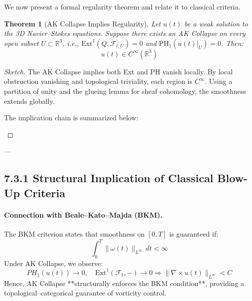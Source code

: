 \documentclass[11pt]{article}
\newtheorem{theorem}{Theorem}[section]
\theoremstyle{definition}
\begin{document}
We now present a formal regularity theorem and relate it to classical criteria.

\begin{theorem}[AK Collapse Implies Regularity]
Let \( u(t) \) be a weak solution to the 3D Navier–Stokes equations.  
Suppose there exists an AK Collapse on every open subset \( U \subset \mathbb{R}^3 \),  
i.e., $\mathrm{Ext}^1(Q, \mathcal{F}_{t,U}) = 0$ and $\mathrm{PH}_1(u(t)|_U) = 0$. Then:
\[
u(t) \in C^\infty(\mathbb{R}^3)
\]
\end{theorem}

\begin{proof}[Sketch]
The AK Collapse implies both Ext and PH vanish locally.  
By local obstruction vanishing and topological triviality, each region is $C^\infty$.  
Using a partition of unity and the glueing lemma for sheaf cohomology, the smoothness extends globally.

\medskip
The implication chain is summarized below:

\begin{center}
\end{center}
\end{proof}

---

\subsection*{7.3.1 Structural Implication of Classical Blow-Up Criteria}

\paragraph{Connection with Beale–Kato–Majda (BKM).}
The BKM criterion states that smoothness on $[0,T]$ is guaranteed if:
\[
\int_0^T \|\omega(t)\|_{L^\infty} \, dt < \infty
\]
Under AK Collapse, we observe:
\[
PH_1(u(t)) \to 0, \quad \mathrm{Ext}^1(\mathcal{F}_t, -) \to 0 \Rightarrow \|\nabla \times u(t)\|_{L^\infty} < C
\]
Hence, AK Collapse **structurally enforces the BKM condition**, providing a topological–categorical guarantee of vorticity control.
\end{document}
